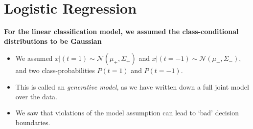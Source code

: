 \section{Logistic Regression}

\textbf{For the linear classification model, we assumed the class-conditional distributions to be Gaussian}
\begin{itemize}
\item We assumed $x| (t=1) \sim \mathcal{N}(\mu_+, \Sigma_+)$ and $x| (t=-1) \sim \mathcal{N}(\mu_-, \Sigma_-)$, and two class-probabilities $P(t=1)$ and $P(t=-1)$.
\item  This is called an \emph{generative model}, as we have written down a full joint model over the data. 
\item  We saw that violations of the model assumption can lead to `bad' decision boundaries.
\end{itemize}

